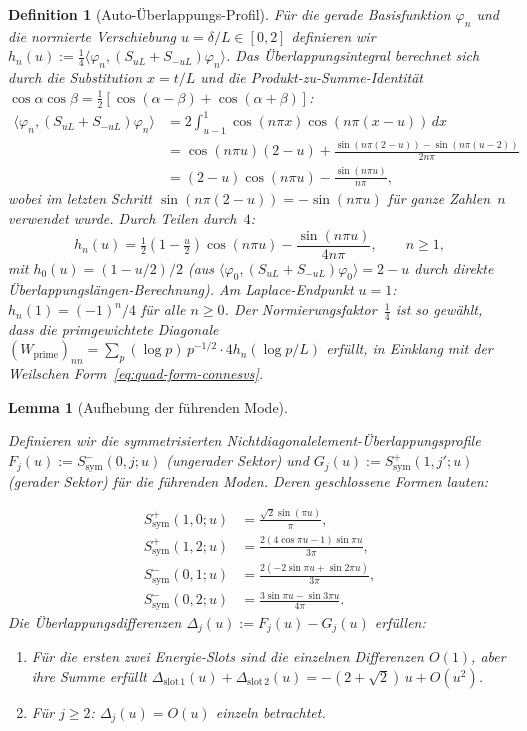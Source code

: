 \documentclass[11pt,a4paper]{article}
\newtheorem{lemma}[lemma]{Lemma}
\newtheorem{definition}[definition]{Definition}
\theoremstyle{remark}
\theoremstyle{plain}
\begin{document}
\begin{definition}[Auto-Überlappungs-Profil]
\label{def:auto-overlap}
Für die gerade Basisfunktion $\varphi_n$ und die normierte Verschiebung $u=\delta/L\in[0,2]$ definieren wir $h_n(u):=\tfrac14\langle\varphi_n,(S_{uL}+S_{-uL})\varphi_n\rangle$. Das Überlappungsintegral berechnet sich durch die Substitution $x=t/L$ und die Produkt-zu-Summe-Identität $\cos\alpha\cos\beta=\tfrac12[\cos(\alpha-\beta)+\cos(\alpha+\beta)]$:
\begin{align*}
  \langle\varphi_n,(S_{uL}+S_{-uL})\varphi_n\rangle
  &= 2\int_{u-1}^{1}\cos(n\pi x)\cos(n\pi(x-u))\,dx \\
  &= \cos(n\pi u)(2-u)
    + \frac{\sin(n\pi(2-u))-\sin(n\pi(u-2))}{2n\pi} \\
  &= (2-u)\cos(n\pi u) - \frac{\sin(n\pi u)}{n\pi},
\end{align*}
wobei im letzten Schritt $\sin(n\pi(2-u))=-\sin(n\pi u)$ für ganze Zahlen~$n$ verwendet wurde. Durch Teilen durch~$4$:
\[
  h_n(u) = \tfrac{1}{2}(1-\tfrac{u}{2})\cos(n\pi u)
           - \frac{\sin(n\pi u)}{4n\pi},
  \qquad n\geq 1,
\]
mit $h_0(u)=(1-u/2)/2$ (aus $\langle\varphi_0,(S_{uL}+S_{-uL})\varphi_0\rangle =2-u$ durch direkte Überlappungslängen-Berechnung).
Am Laplace-Endpunkt $u=1$: $h_n(1)=(-1)^n/4$ für alle $n\geq 0$. Der Normierungsfaktor~$\tfrac14$ ist so gewählt, dass die primgewichtete Diagonale $(W_{\mathrm{prime}})_{nn}=\sum_p(\log p)\,p^{-1/2}\cdot 4h_n(\log p/L)$ erfüllt, in Einklang mit der Weilschen Form~\eqref{eq:quad-form-connesvs}.
\end{definition}

\begin{lemma}[Aufhebung der führenden Mode]
\label{lem:leading-cancel}
\begin{sloppypar}
Definieren wir die symmetrisierten Nichtdia\-gonal\-element-Über\-lap\-pungs\-pro\-file $F_j(u):=S^-_{\mathrm{sym}}(0,j;u)$ (ungerader Sektor) und $G_j(u):=S^+_{\mathrm{sym}}(1,j';u)$ (gerader Sektor) für die führenden Moden. Deren geschlossene Formen lauten:
\end{sloppypar}
\begin{align}
  S^+_{\mathrm{sym}}(1,0;u)
    &= \frac{\sqrt{2}\sin(\pi u)}{\pi}, \label{eq:Scos10} \\
  S^+_{\mathrm{sym}}(1,2;u)
    &= \frac{2(4\cos\pi u - 1)\sin\pi u}{3\pi}, \label{eq:Scos12} \\
  S^-_{\mathrm{sym}}(0,1;u)
    &= \frac{2(-2\sin\pi u + \sin 2\pi u)}{3\pi}, \label{eq:Ssin01} \\
  S^-_{\mathrm{sym}}(0,2;u)
    &= \frac{3\sin\pi u - \sin 3\pi u}{4\pi}. \label{eq:Ssin02}
\end{align}
Die Überlappungsdifferenzen $\Delta_j(u):=F_j(u)-G_j(u)$ erfüllen:
\begin{enumerate}[label=\textup{(\alph*)}]
  \item Für die ersten zwei Energie-Slots sind die einzelnen Differenzen $O(1)$, aber ihre Summe erfüllt $\Delta_{\mathrm{slot\,1}}(u) + \Delta_{\mathrm{slot\,2}}(u) = -(2+\sqrt{2})\,u + O(u^2)$.
  \item Für $j\geq 2$: $\Delta_j(u)=O(u)$ einzeln betrachtet.
\end{enumerate}
\end{lemma}
\end{document}
